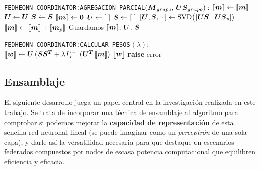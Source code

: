 \documentclass[00-Trabajo_Final.tex]{subfiles}
\begin{document}
\begin{algorithm}[ht]
\caption{Pseudocódigo para la \textbf{agregación parcial} en coordinador FedHEONN}
\label{alg:fedcoord_parcial}
\begin{algorithmic}[1]
\REQUIRE \verb|FEDHEONN_COORDINATOR:AGREGACION_PARCIAL|$(\boldsymbol{M}_{grupo},\, \boldsymbol{US}_{grupo}):$
        \STATE $[\![\boldsymbol{m}]\!] \gets [\![\boldsymbol{m}]\!]$  \hfill {}
        \STATE $\boldsymbol{U} \gets \boldsymbol{U}$  \hfill {}
        \STATE $\boldsymbol{S} \gets \boldsymbol{S}$  \hfill {}
    \ELSE
        \STATE $[\![\boldsymbol{m}]\!] \gets \boldsymbol{0}$ \hfill {}
        \STATE $\boldsymbol{U} \gets [\ ]$ \hfill {}
        \STATE $\boldsymbol{S} \gets [\ ]$
    \ENDIF
        \STATE $[\boldsymbol{U}, \boldsymbol{S}, \sim] \gets \text{SVD}\bigl([\boldsymbol{US} \mid \boldsymbol{US}_p]\bigr)$ \hfill {}
        \STATE $[\![\boldsymbol{m}]\!] \gets [\![\boldsymbol{m}]\!] + [\![\boldsymbol{m}_p]\!]$ \hfill {}
    \ENDFOR
    \STATE Guardamos $[\![\boldsymbol{m}]\!],\, \boldsymbol{U},\, \boldsymbol{S}$ \hfill {}
\ENSURE
\end{algorithmic}
\end{algorithm}

\begin{algorithm}
\caption{Pseudocódigo para calcular \textbf{pesos óptimos} en coordinador FedHEONN}
\label{alg:fedcoord_pesos}
\begin{algorithmic}[1]
    \REQUIRE \verb|FEDHEONN_COORDINATOR:CALCULAR_PESOS|$(\lambda):$
        \STATE $[\![\bsym{w}]\!] \gets \bsym{U} \, (\bsym{SS^T} + \lambda I)\inv \, (\bsym{U^T} \, [\![\bsym{m}]\!])$ \hfill {}
        \RETURN $[\![\boldsymbol{w}]\!]$ \hfill {}
    \ELSE
        \STATE \textbf{raise} error  \hfill {}
    \ENDIF
\ENSURE
\end{algorithmic}
\end{algorithm}

\subsection{Ensamblaje}
El siguiente desarrollo juega un papel central en la investigación realizada en este trabajo. Se trata de incorporar una técnica de ensamblaje al algoritmo para comprobar si podemos mejorar la \textbf{capacidad de representación} de esta sencilla red neuronal lineal (se puede imaginar como un \textit{perceptrón} de una sola capa), y darle así la versatilidad necesaria para que destaque en escenarios federados compuestos por nodos de escasa potencia computacional que equilibren eficiencia y eficacia.
\end{document}
